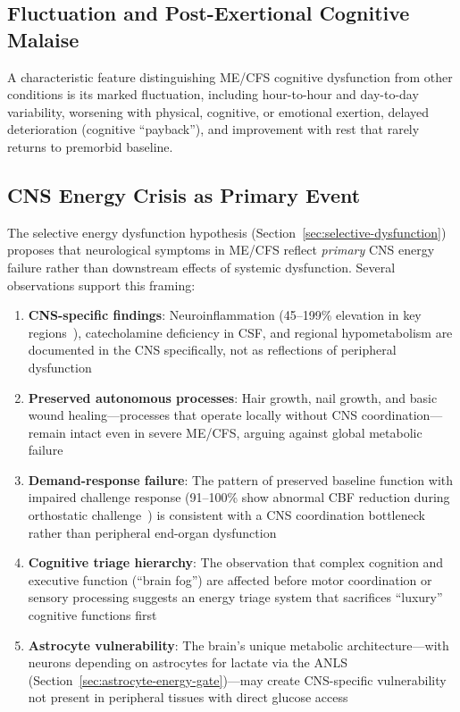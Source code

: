 \subsection{Fluctuation and Post-Exertional Cognitive Malaise}

A characteristic feature distinguishing ME/CFS cognitive dysfunction from other conditions is its marked fluctuation, including hour-to-hour and day-to-day variability, worsening with physical, cognitive, or emotional exertion, delayed deterioration (cognitive ``payback''), and improvement with rest that rarely returns to premorbid baseline.


\subsection{CNS Energy Crisis as Primary Event}
\label{sec:cns-energy-crisis}

The selective energy dysfunction hypothesis (Section~\ref{sec:selective-dysfunction}) proposes that neurological symptoms in ME/CFS reflect \emph{primary} CNS energy failure rather than downstream effects of systemic dysfunction. Several observations support this framing:

\begin{enumerate}
    \item \textbf{CNS-specific findings}: Neuroinflammation (45--199\% elevation in key regions~\cite{Nakatomi2014neuroinflammation}), catecholamine deficiency in CSF, and regional hypometabolism are documented in the CNS specifically, not as reflections of peripheral dysfunction

    \item \textbf{Preserved autonomous processes}: Hair growth, nail growth, and basic wound healing---processes that operate locally without CNS coordination---remain intact even in severe ME/CFS, arguing against global metabolic failure

    \item \textbf{Demand-response failure}: The pattern of preserved baseline function with impaired challenge response (91--100\% show abnormal CBF reduction during orthostatic challenge~\cite{Novak2022}) is consistent with a CNS coordination bottleneck rather than peripheral end-organ dysfunction

    \item \textbf{Cognitive triage hierarchy}: The observation that complex cognition and executive function (``brain fog'') are affected before motor coordination or sensory processing suggests an energy triage system that sacrifices ``luxury'' cognitive functions first

    \item \textbf{Astrocyte vulnerability}: The brain's unique metabolic architecture---with neurons depending on astrocytes for lactate via the ANLS (Section~\ref{sec:astrocyte-energy-gate})---may create CNS-specific vulnerability not present in peripheral tissues with direct glucose access~\cite{Pellerin1994,Magistretti2018}
\end{enumerate}

